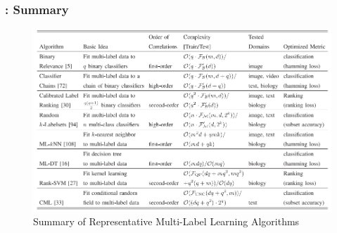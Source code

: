 \documentclass{beamer}
\begin{document}
\begin{frame}
\frametitle{\insertsection : Summary}
\begin{figure}
\begin{center}
\includegraphics[scale = 0.45]{images/summary.png}
\caption{Summary of Representative Multi-Label Learning Algorithms}
\end{center}
\end{figure}
\end{frame}
\end{document}
